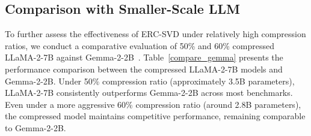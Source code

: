 \subsection{Comparison with Smaller-Scale LLM} \label{gemma}
To further assess the effectiveness of ERC-SVD under relatively high compression ratios, we conduct a comparative evaluation of 50\% and 60\% compressed LLaMA-2-7B against Gemma-2-2B~\cite{gemma_2024}. Table~\ref{compare_gemma} presents the performance comparison between the compressed LLaMA-2-7B models and Gemma-2-2B. Under 50\% compression ratio (approximately 3.5B parameters), LLaMA-2-7B consistently outperforms Gemma-2-2B across most benchmarks. 
Even under a more aggressive 60\% compression ratio (around 2.8B parameters), the compressed model maintains competitive performance, remaining comparable to Gemma-2-2B. 


